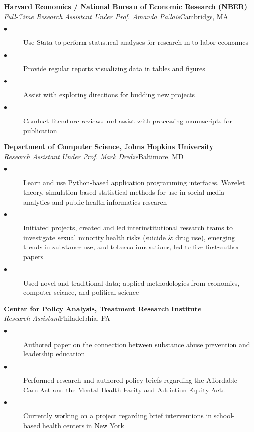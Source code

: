 \documentclass[10pt, letterpaper]{article}
\newcommand{\years}[1]{\marginnote{\normalsize #1}}
\begin{document}
\years{2018-2019}
\textbf{Harvard Economics / National Bureau of Economic Research (NBER)}\\
\emph{Full-Time Research Assistant Under Prof. Amanda Pallais}\hfill Cambridge, MA
    \begin{description}
		\item[$\bullet$]Use Stata to perform statistical analyses for research in to labor economics
		\item[$\bullet$]Provide regular reports visualizing data in tables and figures
		\item[$\bullet$]Assist with exploring directions for budding new projects
		\item[$\bullet$]Conduct literature reviews and assist with processing manuscripts for publication\\[.2cm]
\end{description}


\clearpage

\years{2017}
\textbf{Department of Computer Science, Johns Hopkins University}\\
\emph{Research Assistant Under \href{http://www.cs.jhu.edu/~mdredze/}{Prof. Mark Dredze}}\hfill Baltimore, MD
\begin{description}
  \item[$\bullet$] Learn and use Python-based application programming interfaces, Wavelet theory, simulation-based statistical methods for use in social media analytics and public health informatics research
  \item[$\bullet$]	Initiated projects, created and led interinstitutional research teams to investigate sexual minority health risks (suicide \& drug use), emerging trends in substance use, and tobacco innovations; led to five first-author papers
    \item[$\bullet$]	Used novel and traditional data; applied methodologies from economics, computer science, and political science
    \\[.2cm]
\end{description}


\years{2012-2017}
\textbf{Center for Policy Analysis, Treatment Research Institute}\\%
\emph{Research Assistant}\hfill Philadelphia, PA
\begin{description}
    \item[$\bullet$] Authored paper on the connection between substance abuse prevention and leadership education
    \item[$\bullet$]Performed research and authored policy briefs regarding the Affordable Care Act and the Mental Health Parity and Addiction Equity Acts
    \item[$\bullet$]Currently working on a project regarding brief interventions in school-based health centers in New York
    \\[.2cm]
\end{description}
\end{document}
